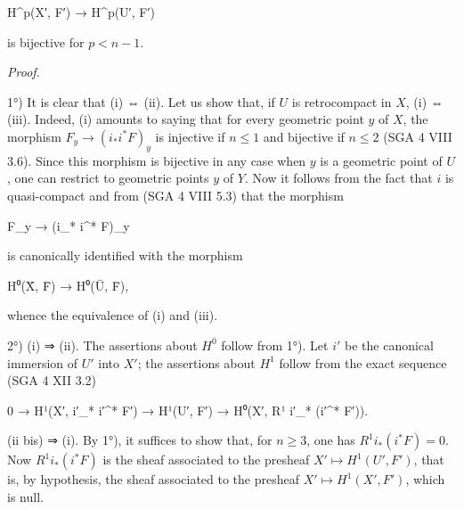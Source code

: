 \documentclass[
]{article}
\newenvironment{Shaded}{}{}
\newcommand{\NormalTok}[1]{#1}
\begin{document}
\begin{Shaded}
\begin{Highlighting}[]
\NormalTok{H\^{}p(X′, F′) → H\^{}p(U′, F′)}
\end{Highlighting}
\end{Shaded}

is bijective for \(p < n - 1\).

\emph{Proof.}

1°) It is clear that (i) ⇔ (ii). Let us show that, if \(U\) is
retrocompact in \(X\), (i) ⇔ (iii). Indeed, (i) amounts to saying that
for every geometric point \(y\) of \(X\), the morphism
\(F_{y} \to (i_{*} i^{*} F)_{y}\) is injective if \(n \leqslant 1\) and
bijective if \(n \leqslant 2\) (SGA 4 VIII 3.6). Since this morphism is
bijective in any case when \(y\) is a geometric point of \(U\), one can
restrict to geometric points \(y\) of \(Y\). Now it follows from the
fact that \(i\) is quasi-compact and from (SGA 4 VIII 5.3) that the
morphism

\begin{Shaded}
\begin{Highlighting}[]
\NormalTok{F\_y → (i\_* i\^{}* F)\_y}
\end{Highlighting}
\end{Shaded}

is canonically identified with the morphism

\begin{Shaded}
\begin{Highlighting}[]
\NormalTok{H⁰(X̄, F̄) → H⁰(Ū, F̄),}
\end{Highlighting}
\end{Shaded}

whence the equivalence of (i) and (iii).

2°) (i) ⇒ (ii). The assertions about \(H^{0}\) follow from 1°). Let
\(i'\) be the canonical immersion of \(U'\) into \(X'\); the assertions
about \(H^{1}\) follow from the exact sequence (SGA 4 XII 3.2)

\begin{Shaded}
\begin{Highlighting}[]
\NormalTok{0 → H¹(X′, i′\_* i′\^{}* F′) → H¹(U′, F′) → H⁰(X′, R¹ i′\_* (i′\^{}* F′)).}
\end{Highlighting}
\end{Shaded}

(ii bis) ⇒ (i). By 1°), it suffices to show that, for \(n \geqslant 3\),
one has \(R^{1} i_{*} (i^{*} F) = 0\). Now \(R^{1} i_{*} (i^{*} F)\) is
the sheaf associated to the presheaf \(X' \mapsto H^{1}(U', F')\), that
is, by hypothesis, the sheaf associated to the presheaf
\(X' \mapsto H^{1}(X', F')\), which is null.
\end{document}
